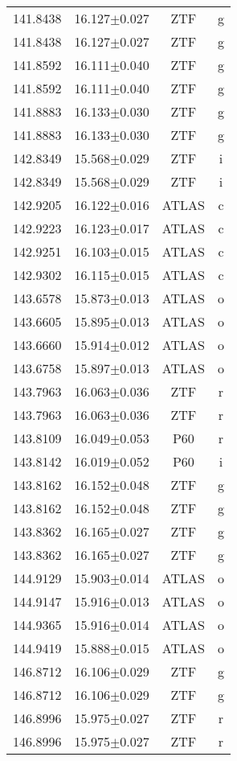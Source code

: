 \begin{table}
\begin{tabular}{cccc}
141.8438 & 16.127$\pm$0.027 & ZTF & g \\
141.8438 & 16.127$\pm$0.027 & ZTF & g \\
141.8592 & 16.111$\pm$0.040 & ZTF & g \\
141.8592 & 16.111$\pm$0.040 & ZTF & g \\
141.8883 & 16.133$\pm$0.030 & ZTF & g \\
141.8883 & 16.133$\pm$0.030 & ZTF & g \\
142.8349 & 15.568$\pm$0.029 & ZTF & i \\
142.8349 & 15.568$\pm$0.029 & ZTF & i \\
142.9205 & 16.122$\pm$0.016 & ATLAS & c \\
142.9223 & 16.123$\pm$0.017 & ATLAS & c \\
142.9251 & 16.103$\pm$0.015 & ATLAS & c \\
142.9302 & 16.115$\pm$0.015 & ATLAS & c \\
143.6578 & 15.873$\pm$0.013 & ATLAS & o \\
143.6605 & 15.895$\pm$0.013 & ATLAS & o \\
143.6660 & 15.914$\pm$0.012 & ATLAS & o \\
143.6758 & 15.897$\pm$0.013 & ATLAS & o \\
143.7963 & 16.063$\pm$0.036 & ZTF & r \\
143.7963 & 16.063$\pm$0.036 & ZTF & r \\
143.8109 & 16.049$\pm$0.053 & P60 & r \\
143.8142 & 16.019$\pm$0.052 & P60 & i \\
143.8162 & 16.152$\pm$0.048 & ZTF & g \\
143.8162 & 16.152$\pm$0.048 & ZTF & g \\
143.8362 & 16.165$\pm$0.027 & ZTF & g \\
143.8362 & 16.165$\pm$0.027 & ZTF & g \\
144.9129 & 15.903$\pm$0.014 & ATLAS & o \\
144.9147 & 15.916$\pm$0.013 & ATLAS & o \\
144.9365 & 15.916$\pm$0.014 & ATLAS & o \\
144.9419 & 15.888$\pm$0.015 & ATLAS & o \\
146.8712 & 16.106$\pm$0.029 & ZTF & g \\
146.8712 & 16.106$\pm$0.029 & ZTF & g \\
146.8996 & 15.975$\pm$0.027 & ZTF & r \\
146.8996 & 15.975$\pm$0.027 & ZTF & r \\

\end{tabular}
\end{table}
